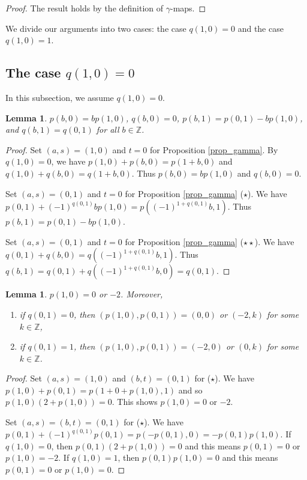 \documentclass[12pt]{amsart}
\newtheorem{lemm}[thm]{Lemma}
\theoremstyle{definition}
\newcommand{\Z}{\mathbb{Z}}
\begin{document}
\begin{proof}
  The result holds by the definition of $\gamma$-maps.
\end{proof}

We divide our arguments into two cases:
the case $q(1,0)=0$ and the case $q(1,0)=1$.

\subsection{The case $q(1,0)=0$}
In this subsection, we assume $q(1,0)=0$.

\begin{lemm}\label{lem4.2}
  $p(b,0)=bp(1,0)$, $q(b,0)=0$,
  $p(b,1)=p(0,1)-bp(1,0)$, and $q(b,1)=q(0,1)$
  for all $b\in \Z$.
\end{lemm}

\begin{proof}
  Set $(a,s)=(1,0)$ and $t=0$ for Proposition \ref{prop_gamma}.
  By $q(1,0)=0$, we have
  $p(1,0)+p(b,0)=p(1+b,0)$ and $q(1,0)+q(b,0)=q(1+b,0)$.
  Thus $p(b,0)=bp(1,0)$ and $q(b,0)=0$.

  Set $(a,s)=(0,1)$ and $t=0$ for Proposition \ref{prop_gamma} ($\star$).
  We have
  $p(0,1)+(-1)^{q(0,1)}bp(1,0)=p((-1)^{1+q(0,1)}b,1)$.
  Thus $p(b,1)=p(0,1)-bp(1,0)$.

  Set $(a,s)=(0,1)$ and $t=0$ for Proposition \ref{prop_gamma} ($\star\star$).
  We have
  $q(0,1)+q(b,0)=q((-1)^{1+q(0,1)}b,1)$.
  Thus $q(b,1)=q(0,1)+q((-1)^{1+q(0,1)}b,0)=q(0,1)$.
\end{proof}

\begin{lemm}\label{lem4.3}
  $p(1,0)=0$ or $-2$. Moreover,
  \begin{enumerate}[{\rm (1)}]
    \item if $q(0,1)=0$,
    then $(p(1,0),p(0,1))=(0,0)$ or $(-2, k)$ for some $k\in \Z$,
    \item if $q(0,1)=1$,
    then $(p(1,0),p(0,1))=(-2,0)$ or $(0, k)$ for some $k\in \Z$.
  \end{enumerate}
\end{lemm}

\begin{proof}
  Set $(a,s)=(1,0)$ and $(b,t)=(0,1)$ for ($\star$).
  We have $p(1,0)+p(0,1)=p(1+0+p(1,0),1)$ and so
  $p(1,0)(2+p(1,0))=0$. This shows $p(1,0)=0$ or $-2$.
  
  Set $(a,s)=(b,t)=(0,1)$ for ($\star$).
  We have $p(0,1)+(-1)^{q(0,1)}p(0,1)=p(-p(0,1),0)=-p(0,1)p(1,0)$.
  If $q(1,0)=0$, then $p(0,1)(2+p(1,0))=0$
  and this means $p(0,1)=0$ or $p(1,0)=-2$.
  If $q(1,0)=1$, then $p(0,1)p(1,0)=0$
  and this means $p(0,1)=0$ or $p(1,0)=0$.
\end{proof}
\end{document}
